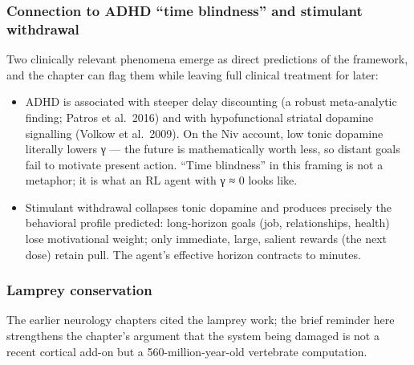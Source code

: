 \subsubsection{Connection to ADHD ``time blindness'' and stimulant withdrawal}\label{01_dopamine_substrate-connection-to-adhd-time-blindness-and-stimulant-withdrawal}

Two clinically relevant phenomena emerge as direct predictions of the framework, and the chapter can flag them while leaving full clinical treatment for later:

\begin{itemize}
\tightlist
\item
  ADHD is associated with steeper delay discounting (a robust meta-analytic finding; Patros et al.~2016) and with hypofunctional striatal dopamine signalling (Volkow et al.~2009). On the Niv account, low tonic dopamine literally lowers γ --- the future is mathematically worth less, so distant goals fail to motivate present action. ``Time blindness'' in this framing is not a metaphor; it is what an RL agent with γ ≈ 0 looks like.
\item
  Stimulant withdrawal collapses tonic dopamine and produces precisely the behavioral profile predicted: long-horizon goals (job, relationships, health) lose motivational weight; only immediate, large, salient rewards (the next dose) retain pull. The agent's effective horizon contracts to minutes.
\end{itemize}

\subsubsection{Lamprey conservation}\label{01_dopamine_substrate-lamprey-conservation}

The earlier neurology chapters cited the lamprey work; the brief reminder here strengthens the chapter's argument that the system being damaged is not a recent cortical add-on but a 560-million-year-old vertebrate computation.

